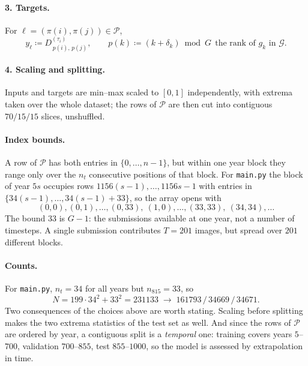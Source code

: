 \documentclass[11pt]{article}
\newcommand{\Gr}{\mathcal{G}}
\begin{document}
\paragraph{3. Targets.} For $\ell = (\pi(i), \pi(j)) \in \mathcal{P}$,
%
\begin{equation}
  y_\ell \coloneqq D^{(\tau_i)}_{\,p(i),\,p(j)},
  \qquad
  p(k) \coloneqq (k + \delta_k) \bmod G
  \ \ \text{the rank of } g_k \text{ in } \Gr .
  \label{eq:targets}
\end{equation}

\paragraph{4. Scaling and splitting.} Inputs and targets are min--max scaled to
$[0,1]$ independently, with extrema taken over the whole dataset; the rows of
$\mathcal{P}$ are then cut into contiguous $70/15/15$ slices, unshuffled.

\paragraph{Index bounds.} A row of $\mathcal{P}$ has both entries in
$\{0, \dots, n-1\}$, but within one year block they range only over the $n_t$
consecutive positions of that block. For \texttt{main.py} the block of year
$5s$ occupies rows $1156(s-1), \dots, 1156s - 1$ with entries in
$\{34(s-1), \dots, 34(s-1)+33\}$, so the array opens with
%
\begin{equation}
  (0,0), (0,1), \dots, (0,33),\ (1,0), \dots, (33,33),\ (34,34), \dots
\end{equation}
%
The bound $33$ is $G - 1$: the submissions available at one year, not a number
of timesteps. A single submission contributes $T = 201$ images, but spread over
$201$ different blocks.

\paragraph{Counts.} For \texttt{main.py}, $n_t = 34$ for all years but
$n_{815} = 33$, so
%
\begin{equation}
  N = 199 \cdot 34^2 + 33^2 = 231133
  \;\longrightarrow\;
  161793 \,/\, 34669 \,/\, 34671 .
  \label{eq:counts}
\end{equation}
%
Two consequences of the choices above are worth stating. Scaling before
splitting makes the two extrema statistics of the test set as well. And since
the rows of $\mathcal{P}$ are ordered by year, a contiguous split is a
\emph{temporal} one: training covers years $5$--$700$, validation
$700$--$855$, test $855$--$1000$, so the model is assessed by extrapolation in
time.
\end{document}
